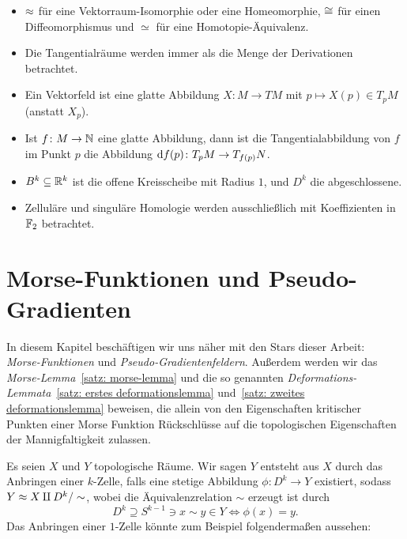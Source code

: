 \documentclass[a4paper,11pt,twoside]{scrreport}
\begin{document}
\begin{itemize}
    \item $\approx$ für eine Vektorraum-Isomorphie oder eine Homeomorphie, $\cong$ für einen Diffeomorphismus
        und $\simeq$ für eine Homotopie-Äquivalenz.
    \item Die Tangentialräume werden immer als die Menge der Derivationen betrachtet.
    \item Ein Vektorfeld ist eine glatte Abbildung $X \colon M \to TM$ mit 
        $p \mapsto X(p) \in T_pM$ (anstatt $X_p$).
    \item Ist $f \colon M \to { \mathbb N }$ eine glatte Abbildung, dann ist die Tangentialabbildung
        von $f$ im Punkt $p$ die Abbildung ${ \operatorname{d} } f (p) \colon T_pM \to T_{f(p)}N$.
    \item $B^k \subseteq { \mathbb R }^k$ ist die offene Kreisscheibe mit Radius $1$, und $D^k$
        die abgeschlossene.
    \item Zelluläre und singuläre Homologie werden ausschließlich mit Koeffizienten in ${ \mathbb F }_2$ betrachtet.
\end{itemize}

\tableofcontents

\cleardoublepage

\chapter{Morse-Funktionen und Pseudo-Gradienten}

\makeheaderfancy
\setcounter{page}{1}

In diesem Kapitel beschäftigen wir uns näher mit den Stars dieser Arbeit: \\
\textit{Morse-Funktionen} und \textit{Pseudo-Gradientenfeldern}. Außerdem werden wir das 
\textit{Morse-Lem\-ma}~\ref{satz: morse-lemma} und die so genannten 
\textit{Deformations-Lemmata}~\ref{satz: erstes deformationslemma} und~\ref{satz: zweites deformationslemma} 
beweisen, die allein von den Eigenschaften kritischer Punkten einer Morse Funktion 
Rückschlüsse auf die topologischen Eigenschaften der Mannigfaltigkeit zulassen.

Es seien $X$ und $Y$ topologische Räume. Wir sagen $Y$ entsteht aus $X$ durch das Anbringen 
einer $k$-Zelle, falls eine stetige Abbildung $\phi \colon D^k \to Y$ existiert, sodass
$Y \approx X \amalg D^k / \sim$, wobei die Äquivalenzrelation $\sim$ erzeugt ist durch
\[ D^k \supseteq S^{k - 1} \ni x \sim y \in Y \Leftrightarrow \phi(x) = y . \]
Das Anbringen einer $1$-Zelle könnte zum Beispiel folgendermaßen aussehen:
\end{document}
